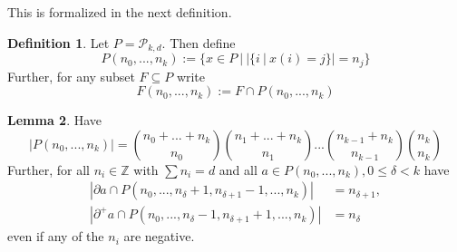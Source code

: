 \documentclass{scrartcl}
\newcommand{\Z}{\mathbb{Z}}
\theoremstyle{definition}
\newtheorem{definition}{Definition}
\newtheorem{lemma}[definition]{Lemma}
\begin{document}
This is formalized in the next definition.
\begin{definition}
    Let $P = \mathcal{P}_{k, d}$. Then define
    \begin{equation*}
        P(n_0, ..., n_k) := \{ x \in P \ | \ |\{i \ | \ x(i) = j\}| = n_j \}
    \end{equation*}
    Further, for any subset $F \subseteq P$ write
    \begin{equation*}
        F(n_0, ..., n_k) := F \cap P(n_0, ..., n_k)
    \end{equation*}
\end{definition}
\begin{lemma}
    \label{prop:properties_n_distribution_subsets}
    Have
    \begin{equation*}
        |P(n_0, ..., n_k)| = { n_0 + ... + n_k \choose n_0 } { n_1 + ... + n_k \choose n_1 } ... {n_{k - 1} + n_k \choose n_{k - 1}} {n_k \choose n_k}
    \end{equation*}
    Further, for all $n_i \in \Z$ with $\sum n_i = d$ and all $a \in P(n_0, ..., n_k), 0 \leq \delta < k$ have
    \begin{align*}
        |\partial a \cap P(n_0, ..., n_\delta + 1, n_{\delta + 1} - 1, ..., n_k)| &= n_{\delta + 1}, \\
        |\partial^+ a \cap P(n_0, ..., n_\delta - 1, n_{\delta + 1} + 1, ..., n_k)| &= n_\delta
    \end{align*}
    even if any of the $n_i$ are negative.
\end{lemma}
\end{document}
